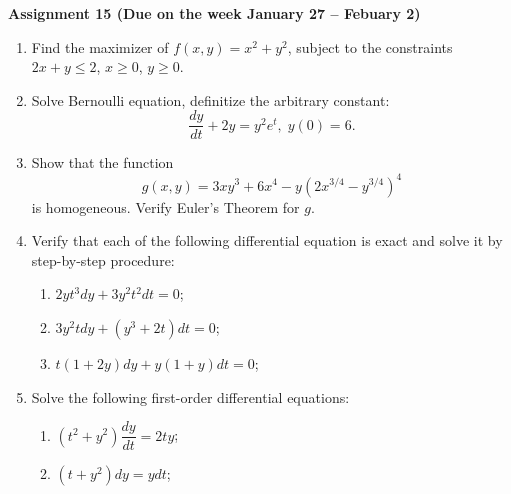 \documentclass{article}
\begin{document}
\fontsize{14}{21}
\selectfont
\centerline{\textbf{Assignment 15 (Due on the week January 27 -- Febuary 2)}}
\fontsize{12}{18}
\selectfont
\begin{enumerate}
\item Find the maximizer of $f(x,y)=x^2+y^2$, subject to the constraints $2x+y\leqslant 2$, $x\geqslant0$, $y\geqslant 0$.

\item Solve Bernoulli equation, definitize the arbitrary constant:
$$\dfrac{dy}{dt}+2y=y^2e^t, \; y(0)=6.$$

\item Show that the function
    $$g(x,y)=3xy^3+6x^4-y(2x^{3/4}-y^{3/4})^4$$
is homogeneous. Verify Euler's Theorem for $g$.

\item Verify that each of the following differential equation is exact and solve it by step-by-step procedure:
\begin{enumerate}
\item $2yt^3dy+3y^2t^2dt=0$;
\item $3y^2tdy+(y^3+2t)dt=0$;
\item $t(1+2y)dy+y(1+y)dt=0$;
\end{enumerate}
\item Solve the following first-order differential equations:
\begin{enumerate}
\item $(t^2+y^2)\dfrac{dy}{dt}=2ty$;
\item $(t+y^2)dy=ydt$;
\end{enumerate}
\end{enumerate}
\end{document}
